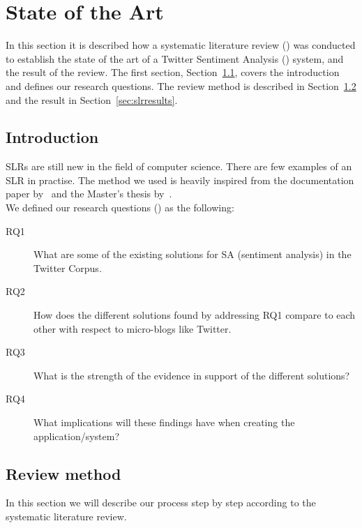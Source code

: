 \chapter{State of the Art}

In this section it is described how a systematic literature review () was conducted to establish the state of the art of a Twitter Sentiment Analysis () system, and the result of the review. The first section, Section~\ref{sec:slrintro}, covers the introduction and defines our research questions. The review method is described in Section~\ref{sec:slrmethod} and the result in Section~\ref{sec:slrresults}.

\section{Introduction}
\label{sec:slrintro}

SLRs are still new in the field of computer science. There are few examples of an SLR in practise. The method we used is heavily inspired from the documentation paper by~\cite{paper:slrdesc} and the Master's thesis by~\cite{master:slr}. \\

\noindent We defined our research questions () as the following:

\begin{description}

\item[RQ1] What are some of the existing solutions for SA (sentiment analysis) in the Twitter Corpus.
\item[RQ2] How does the different solutions found by addressing RQ1 compare to each other with respect to micro-blogs like Twitter.
\item[RQ3] What is the strength of the evidence in support of the different solutions?
\item[RQ4] What implications will these findings have when creating the application/system?

\end{description}

\section{Review method}
\label{sec:slrmethod}

In this section we will describe our process step by step according to the systematic literature review. 

